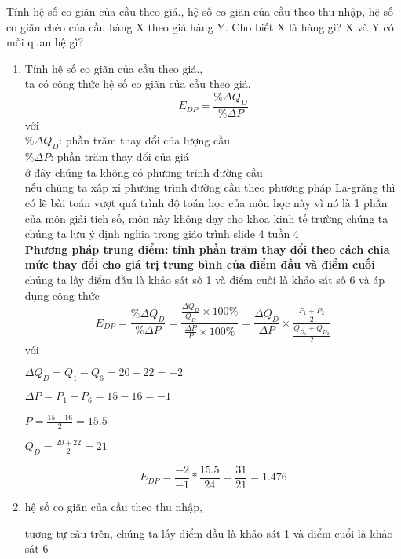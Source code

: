 Tính hệ số co giãn của cầu theo giá., hệ số co giãn của cầu theo thu nhập, hệ số co giãn
chéo của cầu hàng X theo giá hàng Y. Cho biết X là hàng gì? X và Y có mối quan hệ gì?

\begin{enumerate}
  \item Tính hệ số co giãn của cầu theo giá.,
        \\
        ta có công thức hệ số co giãn của cầu theo giá.
        \[ E_{DP} = \frac{\%\Delta Q_D}{\%\Delta P} \]
        với \\
        $\%\Delta Q_D$: phần trăm thay đổi của lượng cầu \\
        $\%\Delta P$: phần trăm thay đổi của giá \\

        ở đây chúng ta không có phương trình đường cầu \\
        nếu chúng ta xấp xỉ phương trình đường cầu theo phương pháp
        La-grăng thì có lẽ bài toán vượt quá trình độ toán học của môn học này
        vì nó là 1 phần của môn giải tich số, môn này không dạy cho khoa kinh tế trường
        chúng ta \\
        chúng ta lưu ý định nghia trong giáo trình slide 4 tuần 4 \\
        \textbf{Phương pháp trung điểm: tính phần trăm thay đổi theo
          cách chia mức thay đổi cho giá trị trung bình của điểm
          đầu và điểm cuối}\\

        chúng ta lấy điểm đầu là khảo sát số 1 và điểm cuối là khảo sát số 6
        và áp dụng công thức
        \[ E_{DP} = \frac{\%\Delta Q_D}{\%\Delta P} =
          \frac{\frac{\Delta Q_D}{Q_D} \times 100 \% }{ \frac{\Delta P}{P} \times 100 \%  } =
          \frac{\Delta Q_D}{\Delta P}  \times
          \frac{\frac{P_1 + P_2}{2}}{\frac{Q_{D_1} + Q_{D_2}}{2}} \]
        với

        $\Delta Q_D = Q_1 - Q_6 = 20 - 22 = -2$

        $\Delta P = P_1 - P_6 = 15 - 16 = -1$

        $ P = \frac{15 + 16}{2} = 15.5$

        $ Q_D = \frac{20 + 22}{2} = 21$

        \[ E_{DP} = \frac{-2}{-1} * \frac{15.5}{24} = \frac{31}{21} = 1.476  \]


  \item  hệ số co giãn của cầu theo thu nhập,

        tương tự câu trên, chúng ta lấy điểm đầu là khảo sát 1 và điểm cuổi là khảo sát 6


\end{enumerate}
